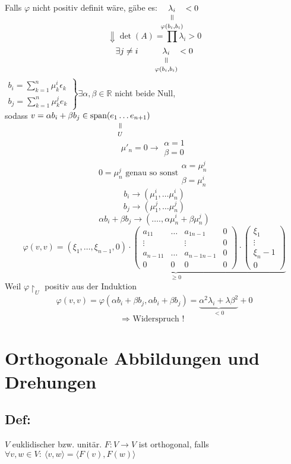 \documentclass[titlepage,12pt,a4paper,ngerman]{report}
\newcommand{\verteq}{\rotatebox{90}{$\,=$}}
\newcommand{\equalto}[2]{\underset{\scriptstyle\overset{\mkern4mu\verteq}{#2}}{#1}}
\newcommand{\tx}[1]{\textrm{#1}}
\newcommand{\ub}[1]{\underbrace{#1}}
\newcommand{\spa}{\tx{span}}
\newcommand{\summ}[2]{\sum_{#1}^{#2}}
\newcommand{\ska}[2]{\langle #1 , #2 \rangle}
\begin{document}
Falls $ \varphi $ nicht positiv definit wäre, gäbe es: $ \equalto{\lambda_i}{\varphi(b_i,b_i)} < 0 $
$$ \Downarrow \det(A) = \prod \lambda_i > 0$$
$$ \exists j \neq i \qquad \equalto{\lambda_i}{\varphi(b_i,b_i)} < 0$$
$\left. \begin{array}{l}
b_i = \summ{k=1}{n} \mu_k^i \epsilon_k \\ b_j = \summ{k=1}{n} \mu_k^j e_k
\end{array} \right \} \exists \alpha, \beta \in \mathbb R $ nicht beide Null,\\[10pt]
sodass $v = \alpha b_i + \beta b_j \in \equalto{\spa (e_1 \dots e_{n+1})}{U}$ 
$$\mu'_n = 0 \rightarrow \begin{array}{c}
\alpha = 1 \\ \beta = 0
\end{array}$$
$$0 = \mu^j_n \tx{ genau so sonst} \begin{array}{c}
\alpha = \mu_n^j \\ \beta = \mu_n^i
\end{array}$$
$$b_i \rightarrow (\mu_1^i,\dots \mu_n^i)$$
$$b_j \rightarrow (\mu_1^j,\dots \mu_n^j)$$
$$\alpha b_i + \beta b_j \rightarrow (\dots., \alpha \mu^i_n + \beta \mu_n^j)$$
$$ \varphi(v,v) = \ub{( \xi_1, \dots , \xi_{n-1},0) \cdot \begin{pmatrix}
	a_{11} & \dots & a_{1n-1}& 0\\
	\vdots & & \vdots & 0\\
	a_{n-1 1} & \dots & a_{n-1 n-1} & 0\\
	0 & 0 & 0 & 0
	\end{pmatrix}\cdot \begin{pmatrix}
	\xi_1\\
	\vdots\\
	\xi_n-1\\
	0
	\end{pmatrix}}_{\ge 0}$$
Weil $ \varphi \upharpoonright_U $ positiv aus der Induktion
$$ \varphi(v,v) = \varphi( \alpha b_i + \beta b_j , \alpha b_i + \beta b_j) = \ub{ \alpha^2 \lambda _i + \lambda \beta^2 }_{< 0} + 0$$
$$\Rightarrow \tx{ Widerspruch ! }$$

\section{Orthogonale Abbildungen und Drehungen}
\subsection{Def:} $V$ euklidischer bzw. unitär. $F:V \to V$ ist orthogonal, falls $\forall v,w \in V:\ \ska{v}{w} = \ska{F(v)}{F(w)}$
\end{document}
